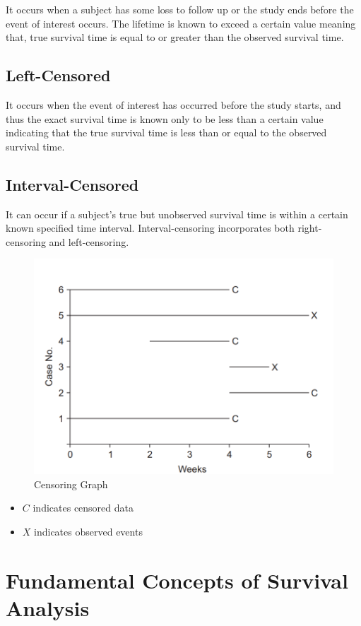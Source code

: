 \documentclass[doublespacing]{report} %
\begin{document}
It occurs when a subject has some loss to follow up or the study ends before the event of interest occurs. The lifetime is known to exceed a certain value meaning that, true survival time is equal to or greater than the observed survival time.

\subsection{Left-Censored}

It occurs when the event of interest has occurred before the study starts, and thus the exact survival time is known only to be less than a certain value indicating that the true survival time is less than or equal to the observed survival time.

\subsection{Interval-Censored}
It can occur if a subject’s true but unobserved survival time is within a certain known specified time interval. Interval-censoring incorporates both right-censoring and left-censoring. 

\begin{figure}[H]
    \centering
    \includegraphics[width=0.5\linewidth]{Figure 3/3.2.png}
    \caption{Censoring Graph}
    \label{Figure 3.2}
\end{figure}


\begin{itemize}

\item \(C\) indicates censored data
\item  \(X\) indicates observed events


\end{itemize}


\section{Fundamental Concepts of Survival Analysis}
\end{document}

